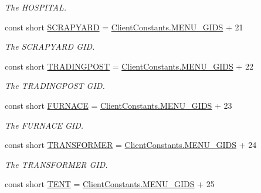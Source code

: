 \begin{DoxyCompactItemize}
\begin{DoxyCompactList}\small\item\em The H\+O\+S\+P\+I\+T\+A\+L. \end{DoxyCompactList}\item 
const short \hyperlink{classClient_1_1Common_1_1Constants_1_1BuildingMenuGid_a95f094cd2083fab3716e64697fbe8a55}{S\+C\+R\+A\+P\+Y\+A\+R\+D} = \hyperlink{classClient_1_1Common_1_1Constants_1_1ClientConstants_a4d3b0e4f36481c991c9995cb20c9347d}{Client\+Constants.\+M\+E\+N\+U\+\_\+\+G\+I\+D\+S} + 21
\begin{DoxyCompactList}\small\item\em The S\+C\+R\+A\+P\+Y\+A\+R\+D G\+I\+D. \end{DoxyCompactList}\item 
const short \hyperlink{classClient_1_1Common_1_1Constants_1_1BuildingMenuGid_a9fb807de52e267ae64a53569fa73288f}{T\+R\+A\+D\+I\+N\+G\+P\+O\+S\+T} = \hyperlink{classClient_1_1Common_1_1Constants_1_1ClientConstants_a4d3b0e4f36481c991c9995cb20c9347d}{Client\+Constants.\+M\+E\+N\+U\+\_\+\+G\+I\+D\+S} + 22
\begin{DoxyCompactList}\small\item\em The T\+R\+A\+D\+I\+N\+G\+P\+O\+S\+T G\+I\+D. \end{DoxyCompactList}\item 
const short \hyperlink{classClient_1_1Common_1_1Constants_1_1BuildingMenuGid_a4f130c7786c07b2b4c38e6e1cb663aee}{F\+U\+R\+N\+A\+C\+E} = \hyperlink{classClient_1_1Common_1_1Constants_1_1ClientConstants_a4d3b0e4f36481c991c9995cb20c9347d}{Client\+Constants.\+M\+E\+N\+U\+\_\+\+G\+I\+D\+S} + 23
\begin{DoxyCompactList}\small\item\em The F\+U\+R\+N\+A\+C\+E G\+I\+D. \end{DoxyCompactList}\item 
const short \hyperlink{classClient_1_1Common_1_1Constants_1_1BuildingMenuGid_a8d4e14fc466f4769735c2784cab11f03}{T\+R\+A\+N\+S\+F\+O\+R\+M\+E\+R} = \hyperlink{classClient_1_1Common_1_1Constants_1_1ClientConstants_a4d3b0e4f36481c991c9995cb20c9347d}{Client\+Constants.\+M\+E\+N\+U\+\_\+\+G\+I\+D\+S} + 24
\begin{DoxyCompactList}\small\item\em The T\+R\+A\+N\+S\+F\+O\+R\+M\+E\+R G\+I\+D. \end{DoxyCompactList}\item 
const short \hyperlink{classClient_1_1Common_1_1Constants_1_1BuildingMenuGid_a9112e4dd5f8d2d7da2dbf7144d42c8d2}{T\+E\+N\+T} = \hyperlink{classClient_1_1Common_1_1Constants_1_1ClientConstants_a4d3b0e4f36481c991c9995cb20c9347d}{Client\+Constants.\+M\+E\+N\+U\+\_\+\+G\+I\+D\+S} + 25

\end{DoxyCompactItemize}

